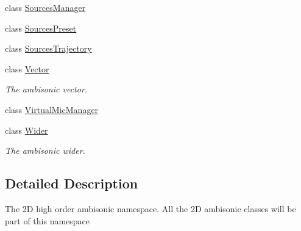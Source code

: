 \begin{DoxyCompactItemize}
\item 
class \hyperlink{class_hoa2_d_1_1_sources_manager}{Sources\-Manager}
\item 
class \hyperlink{class_hoa2_d_1_1_sources_preset}{Sources\-Preset}
\item 
class \hyperlink{class_hoa2_d_1_1_sources_trajectory}{Sources\-Trajectory}
\item 
class \hyperlink{class_hoa2_d_1_1_vector}{Vector}
\begin{DoxyCompactList}\small\item\em The ambisonic vector. \end{DoxyCompactList}\item 
class \hyperlink{class_hoa2_d_1_1_virtual_mic_manager}{Virtual\-Mic\-Manager}
\item 
class \hyperlink{class_hoa2_d_1_1_wider}{Wider}
\begin{DoxyCompactList}\small\item\em The ambisonic wider. \end{DoxyCompactList}\end{DoxyCompactItemize}


\subsection{Detailed Description}
The 2\-D high order ambisonic namespace. All the 2\-D ambisonic classes will be part of this namespace 